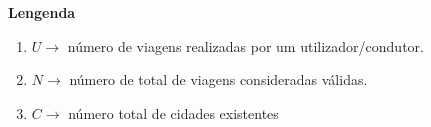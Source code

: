 \documentclass[12pt,a4paper]{report}
\begin{document}
\vspace{10pt}

\normalsize\textbf{Lengenda}
    \begin{enumerate}
    \item \(U \rightarrow\) número de viagens realizadas por um utilizador/condutor.
    \item \(N \rightarrow\) número de total de viagens consideradas válidas. 
    \item \(C \rightarrow\) número total de cidades existentes
\end{enumerate}
\end{document}
